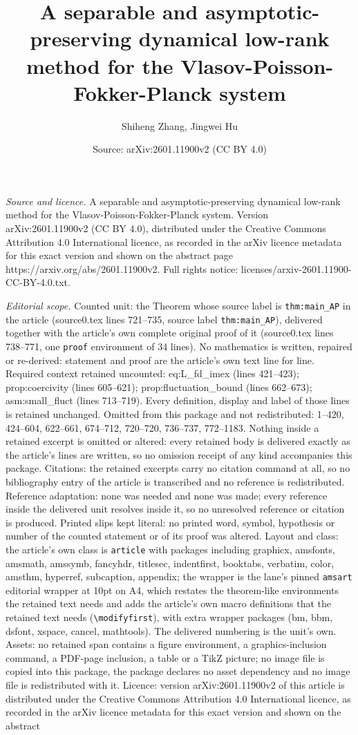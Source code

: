 \documentclass[10pt,a4paper]{amsart}
\title[A separable and asymptotic-preserving dynamical low-rank met]{A separable and asymptotic-preserving dynamical low-rank method for the Vlasov-Poisson-Fokker-Planck system}
\author{Shiheng Zhang, Jingwei Hu}
\date{Source: arXiv:2601.11900v2 (CC BY 4.0)}
\begin{document}
\maketitle

\noindent\emph{Source and licence.} A separable and asymptotic-preserving dynamical low-rank method for the Vlasov-Poisson-Fokker-Planck system. Version arXiv:2601.11900v2 (CC BY 4.0), distributed under the Creative Commons Attribution 4.0 International licence, as recorded in the arXiv licence metadata for this exact version and shown on the abstract page https://arxiv.org/abs/2601.11900v2. Full rights notice: licenses/arxiv-2601.11900-CC-BY-4.0.txt.\par\smallskip

\noindent\textit{Editorial scope.} Counted unit: the Theorem whose source label is \texttt{thm:main\_AP} in the article (source0.tex lines 721--735, source label \texttt{thm:main\_AP}), delivered together with the article's own complete original proof of it (source0.tex lines 738--771, one \texttt{proof} environment of 34 lines). No mathematics is written, repaired or re-derived: statement and proof are the article's own text line for line. Required context retained uncounted: eq:L\_fd\_imex (lines 421--423); prop:coercivity (lines 605--621); prop:fluctuation\_bound (lines 662--673); asm:small\_fluct (lines 713--719). Every definition, display and label of those lines is retained unchanged. Omitted from this package and not redistributed: 1--420, 424--604, 622--661, 674--712, 720--720, 736--737, 772--1183. Nothing inside a retained excerpt is omitted or altered: every retained body is delivered exactly as the article's lines are written, so no omission receipt of any kind accompanies this package. Citations: the retained excerpts carry no citation command at all, so no bibliography entry of the article is transcribed and no reference is redistributed. Reference adaptation: none was needed and none was made; every reference inside the delivered unit resolves inside it, so no unresolved reference or citation is produced. Printed slips kept literal: no printed word, symbol, hypothesis or number of the counted statement or of its proof was altered. Layout and class: the article's own class is \texttt{article} with packages including graphicx, amsfonts, amsmath, amssymb, fancyhdr, titlesec, indentfirst, booktabs, verbatim, color, amsthm, hyperref, subcaption, appendix; the wrapper is the lane's pinned \texttt{amsart} editorial wrapper at 10pt on A4, which restates the theorem-like environments the retained text needs and adds the article's own macro definitions that the retained text needs (\texttt{\textbackslash modifyfirst}), with extra wrapper packages (bm, bbm, dsfont, xspace, cancel, mathtools). The delivered numbering is the unit's own. Assets: no retained span contains a figure environment, a graphics-inclusion command, a PDF-page inclusion, a table or a TikZ picture; no image file is copied into this package, the package declares no asset dependency and no image file is redistributed with it. Licence: version arXiv:2601.11900v2 of this article is distributed under the Creative Commons Attribution 4.0 International licence, as recorded in the arXiv licence metadata for this exact version and shown on the abstract 
\end{document}
